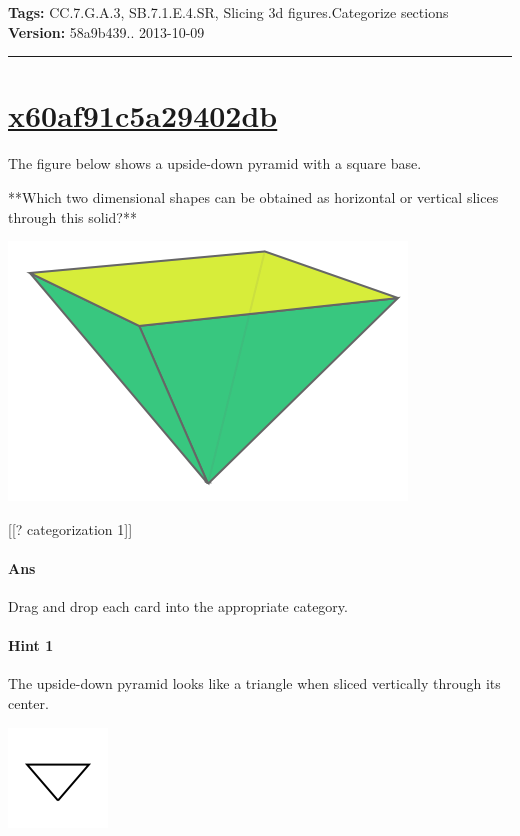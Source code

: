 \documentclass[twocolumn,10pt]{article}
\def\shrinkfactor{0.4}
\begin{document}
\medskip
\noindent
\textbf{Tags:} {\footnotesize CC.7.G.A.3, SB.7.1.E.4.SR, Slicing 3d figures.Categorize sections}\\
\textbf{Version:} 58a9b439.. 2013-10-09
\smallskip\hrule





\section{\href{https://www.khanacademy.org/devadmin/content/items/x60af91c5a29402db}{x60af91c5a29402db}}

\noindent
The figure below shows a upside-down pyramid with a square base. 

**Which two dimensional shapes can be obtained as  horizontal or vertical slices through this solid?**  


\includegraphics[scale=\shrinkfactor]{figures/45af389acb5f166ac18e94dbcfed4f1b2e621634.png}

[[? categorization 1]]

\paragraph{Ans} Drag and drop each card into the appropriate category. 

\paragraph{Hint 1}The upside-down pyramid looks like a triangle when sliced vertically through its center.  

\includegraphics[scale=\shrinkfactor]{figures/f9f5acc90c6c1dd156d5024f368afd3d7d9de230.png}
\end{document}
